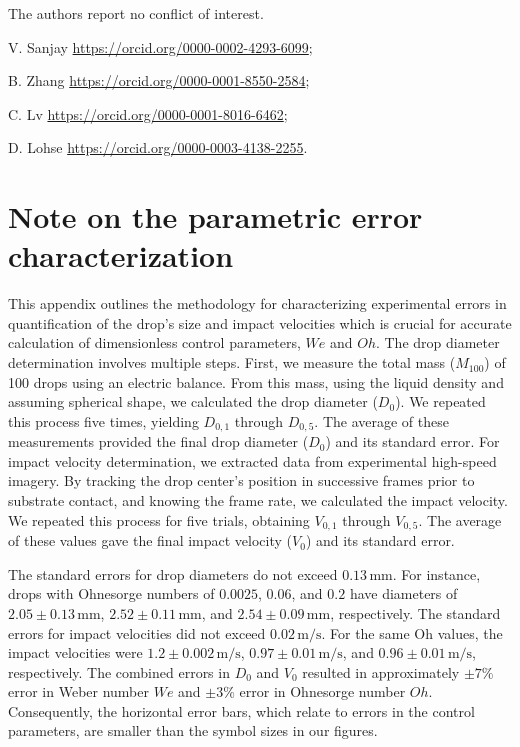 \documentclass{jfm}
\newcommand{\oo}{\color{magenta} \normalfont}
\newcommand{\bb}{\color{black} \normalfont}
\begin{document}
 The authors report no conflict of interest.\\


V. Sanjay \href{https://orcid.org/0000-0002-4293-6099}{https://orcid.org/0000-0002-4293-6099}; 

B. Zhang \href{https://orcid.org/0000-0001-8550-2584}{https://orcid.org/0000-0001-8550-2584};

C. Lv \href{https://orcid.org/0000-0001-8016-6462}{https://orcid.org/0000-0001-8016-6462};

D. Lohse \href{https://orcid.org/0000-0003-4138-2255}{https://orcid.org/0000-0003-4138-2255}. \\

\appendix
\renewcommand{\thefigure}{\Alph{section}\,\arabic{figure}}
\setcounter{figure}{0}

\oo
\section{Note on the parametric error characterization}
\label{app:error}

This appendix outlines the methodology for characterizing experimental errors in quantification of the drop's size and impact velocities which is crucial for accurate calculation of dimensionless control parameters, $We$ and $Oh$.
The drop diameter determination involves multiple steps. First, we measure the total mass ($M_{100}$) of 100 drops using an electric balance. From this mass, using the liquid density and assuming spherical shape, we calculated the drop diameter ($D_0$). 
We repeated this process five times, yielding $D_{0,1}$ through $D_{0,5}$. The average of these measurements provided the final drop diameter ($D_0$) and its standard error.
For impact velocity determination, we extracted data from experimental high-speed imagery. By tracking the drop center's position in successive frames prior to substrate contact, and knowing the frame rate, we calculated the impact velocity. We repeated this process for five trials, obtaining $V_{0,1}$ through $V_{0,5}$. The average of these values gave the final impact velocity ($V_0$) and its standard error.

The standard errors for drop diameters do not exceed $0.13\,\si{\milli\meter}$. For instance, drops with Ohnesorge numbers of $0.0025$, $0.06$, and $0.2$ have diameters of $2.05 \pm 0.13\,\si{\milli\meter}$, $2.52 \pm 0.11\,\si{\milli\meter}$, and $2.54 \pm 0.09\,\si{\milli\meter}$, respectively. 
The standard errors for impact velocities did not exceed $0.02\,\si{\meter}/\si{\second}$. For the same Oh values, the impact velocities were $1.2 \pm 0.002\,\si{\meter}/\si{\second}$, $0.97 \pm 0.01\,\si{\meter}/\si{\second}$, and $0.96 \pm 0.01\,\si{\meter}/\si{\second}$, respectively.
The combined errors in $D_0$ and $V_0$ resulted in approximately $\pm 7\%$ error in Weber number $We$ and $\pm 3\%$ error in Ohnesorge number $Oh$. Consequently, the horizontal error bars, which relate to errors in the control parameters, are smaller than the symbol sizes in our figures.
\bb
\end{document}
